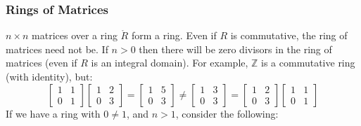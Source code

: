         \subsubsection{Rings of Matrices}
            $n\times{n}$ matrices over a ring $\ring{R}$ form a ring. Even
            if $R$ is commutative, the ring of matrices need not be. If
            $n>0$ then there will be zero divisors in the ring of matrices
            (even if $R$ is an integral domain). For example,
            $\mathbb{Z}$ is a commutative ring (with identity), but:
            \begin{equation}
                \begin{bmatrix}
                    1&1\\
                    0&1
                \end{bmatrix}
                \begin{bmatrix}
                    1&2\\
                    0&3
                \end{bmatrix}
                =
                \begin{bmatrix}
                    1&5\\
                    0&3
                \end{bmatrix}
                \ne
                \begin{bmatrix}
                    1&3\\
                    0&3
                \end{bmatrix}
                =
                \begin{bmatrix}
                    1&2\\
                    0&3
                \end{bmatrix}
                \begin{bmatrix}
                    1&1\\
                    0&1
                \end{bmatrix}
            \end{equation}
            If we have a ring with $0\ne{1}$, and $n>1$, consider the
            following:
